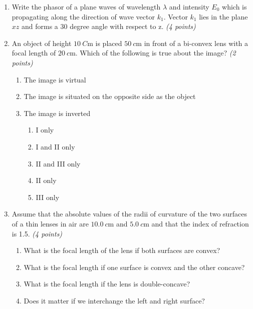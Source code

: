 \documentclass[main.tex]{subfiles}
\begin{document}
\begin{enumerate}

\item Write the phasor of a plane waves of wavelength $\lambda$ and intensity $E_0$ which is propagating along the direction of wave vector $k_1$. Vector $k_1$ lies in the plane $xz$ and forms a 30 degree angle with respect to z. \textit{(4 points)}\\


\item An object of height $\SI{10}{C\metre}$ is placed $\SI{50}{c\metre}$ in front of a bi-convex lens with a focal length of $\SI{20}{c\metre}$. Which of the following is true about the image? \textit{(2 points)}\\

\begin{enumerate}[I]
  \item The image is virtual 
  \item The image is situated on the opposite side as the object
  \item The image is inverted
  \begin{enumerate}[A]
    \item I only
    \item I and II only
    \item II and III only
    \item II only
    \item III only
  \end{enumerate}
\end{enumerate}


\item Assume that the absolute values of the radii of curvature of the two surfaces of a thin lenses in air are $\SI{10.0}{c\metre}$ and $\SI{5.0}{c\metre}$ and that the index of refraction is 1.5. \textit{(4 points)}\\

\begin{enumerate}[a]
  \item What is the focal length of the lens if both surfaces are convex? 
  \item What is the focal length if one surface is convex and the other concave?
  \item What is the focal length if the lens is double-concave?
  \item Does it matter if we interchange the left and right surface?
\end{enumerate}


\end{enumerate}
\end{document}
